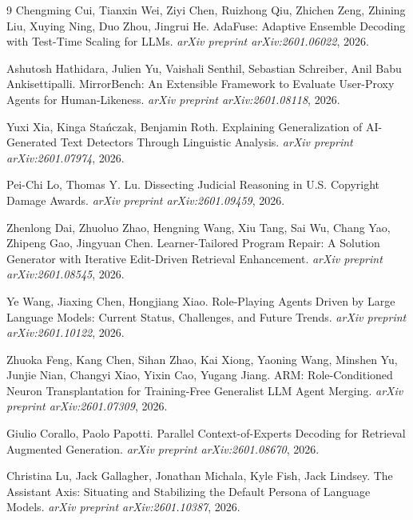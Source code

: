 \begin{thebibliography}{9}
Chengming Cui, Tianxin Wei, Ziyi Chen, Ruizhong Qiu, Zhichen Zeng, Zhining Liu, Xuying Ning, Duo Zhou, Jingrui He. \newblock AdaFuse: Adaptive Ensemble Decoding with Test-Time Scaling for LLMs. \newblock \emph{arXiv preprint arXiv:2601.06022}, 2026.

Ashutosh Hathidara, Julien Yu, Vaishali Senthil, Sebastian Schreiber, Anil Babu Ankisettipalli. \newblock MirrorBench: An Extensible Framework to Evaluate User-Proxy Agents for Human-Likeness. \newblock \emph{arXiv preprint arXiv:2601.08118}, 2026.

Yuxi Xia, Kinga Stańczak, Benjamin Roth. \newblock Explaining Generalization of AI-Generated Text Detectors Through Linguistic Analysis. \newblock \emph{arXiv preprint arXiv:2601.07974}, 2026.

Pei-Chi Lo, Thomas Y. Lu. \newblock Dissecting Judicial Reasoning in U.S. Copyright Damage Awards. \newblock \emph{arXiv preprint arXiv:2601.09459}, 2026.

Zhenlong Dai, Zhuoluo Zhao, Hengning Wang, Xiu Tang, Sai Wu, Chang Yao, Zhipeng Gao, Jingyuan Chen. \newblock Learner-Tailored Program Repair: A Solution Generator with Iterative Edit-Driven Retrieval Enhancement. \newblock \emph{arXiv preprint arXiv:2601.08545}, 2026.

Ye Wang, Jiaxing Chen, Hongjiang Xiao. \newblock Role-Playing Agents Driven by Large Language Models: Current Status, Challenges, and Future Trends. \newblock \emph{arXiv preprint arXiv:2601.10122}, 2026.

Zhuoka Feng, Kang Chen, Sihan Zhao, Kai Xiong, Yaoning Wang, Minshen Yu, Junjie Nian, Changyi Xiao, Yixin Cao, Yugang Jiang. \newblock ARM: Role-Conditioned Neuron Transplantation for Training-Free Generalist LLM Agent Merging. \newblock \emph{arXiv preprint arXiv:2601.07309}, 2026.

Giulio Corallo, Paolo Papotti. \newblock Parallel Context-of-Experts Decoding for Retrieval Augmented Generation. \newblock \emph{arXiv preprint arXiv:2601.08670}, 2026.

Christina Lu, Jack Gallagher, Jonathan Michala, Kyle Fish, Jack Lindsey. \newblock The Assistant Axis: Situating and Stabilizing the Default Persona of Language Models. \newblock \emph{arXiv preprint arXiv:2601.10387}, 2026.


\end{thebibliography}
